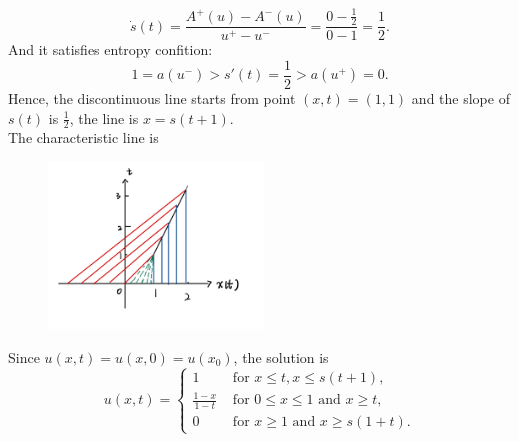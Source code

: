 \documentclass[12pt]{article}%
\begin{document}
\begin{equation*}
    \dot{s}(t)=\frac{A^{+}(u)-A^{-}(u)}{u^{+}-u^{-}}=\frac{0-\frac{1}{2}}{0-1}=\frac{1}{2}.
\end{equation*}
And it satisfies entropy confition:
\[ 1=a(u^{-})>s'(t)=\frac{1}{2}>a(u^{+})=0.\]
Hence, the discontinuous line starts from point $(x,t)=(1,1)$ and the slope of $s(t)$ is $\frac{1}{2}$, the line is $x=s(t+1)$.\\
The characteristic line is 
\begin{figure}[h]
    \centering
    \includegraphics[width=0.51\textwidth]{Graph 2.jpeg} %
    \label{fig:The second graph of characteristic lines}
  \end{figure}

Since $u(x,t)=u(x,0)=u(x_{0})$, the solution is 
\begin{equation*}u(x,t)=
    \begin{cases}
        1 & \text{ for } x \le t, x\le s(t+1),\\
        \frac{1-x}{1-t} & \text{ for } 0\le x\le 1\text{ and } x\ge t,\\
        0 & \text{ for }  x\ge 1 \text{ and } x\ge s(1+t).
    \end{cases}
\end{equation*}

\end{document}
